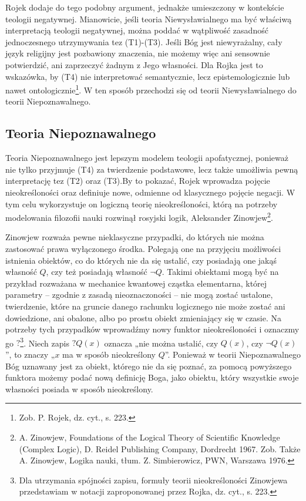 Rojek dodaje do tego podobny argument, jednakże umieszczony w kontekście
teologii negatywnej. Mianowicie, jeśli teoria Niewysławialnego ma być
właściwą interpretacją teologii negatywnej, można poddać w wątpliwość
zasadność jednoczesnego utrzymywania tez (T1)-(T3). Jeśli Bóg jest
niewyrażalny, cały język religijny jest pozbawiony znaczenia, nie
możemy więc ani sensownie potwierdzić, ani zaprzeczyć żadnym z Jego
własności. Dla Rojka jest to wskazówka, by (T4) nie interpretować
semantycznie, lecz epistemologicznie lub nawet ontologicznie\footnote{
Zob. P. Rojek, dz. cyt., s. 223. }. W ten sposób przechodzi się od
teorii Niewysławialnego do teorii Niepoznawalnego.


\subsection{Teoria Niepoznawalnego}

Teoria Niepoznawalnego jest lepszym modelem teologii apofatycznej,
ponieważ nie tylko przyjmuje (T4) za twierdzenie podstawowe, lecz także
umożliwia pewną interpretację tez (T2) oraz (T3).By to pokazać, Rojek
wprowadza pojęcie nieokreśloności oraz definiuje nowe, odmienne od
klasycznego pojęcie negacji. W tym celu wykorzystuje on logiczną teorię
nieokreśloności, którą na potrzeby modelowania filozofii nauki rozwinął
rosyjski logik, Aleksander Zinowjew\footnote{A. Zinowjew, Foundations
of the Logical Theory of Scientific Knowledge (Complex Logic), D.
Reidel Publishing Company, Dordrecht 1967. Zob. Także A. Zinowjew,
Logika nauki, tłum. Z. Simbierowicz, PWN, Warszawa 1976. }.

Zinowjew rozważa pewne nieklasyczne przypadki, do których nie można
zastosować prawa wyłączonego środka. Polegają one na przyjęciu
możliwości istnienia obiektów, co do których nie da się ustalić, czy
posiadają one jakąś własność $Q$, czy też posiadają własność
$\neg Q$. Takimi obiektami mogą być na przykład rozważana
w mechanice kwantowej cząstka elementarna, której parametry -- zgodnie z
zasadą nieoznaczoności -- nie mogą zostać ustalone, twierdzenie, które
na gruncie danego rachunku logicznego nie może zostać ani dowiedzione,
ani obalone, albo po prostu obiekt zmieniający się w czasie. Na
potrzeby tych przypadków wprowadźmy nowy funktor nieokreśloności i
oznaczmy go $?$\footnote{Dla utrzymania spójności zapisu, formuły teorii
nieokreśloności Zinowjewa przedstawiam w notacji zaproponowanej przez
Rojka, dz. cyt., s. 223.  }. Niech zapis $?Q(x)$ oznacza „nie można
ustalić, czy $Q(x)$, czy $\neg Q(x)$”, to znaczy „$x$ ma w sposób
nieokreślony $Q$”. Ponieważ w teorii Niepoznawalnego Bóg uznawany jest za
obiekt, którego nie da się poznać, za pomocą powyższego funktora możemy
podać nową definicję Boga, jako obiektu, który wszystkie swoje
własności posiada w sposób nieokreślony.

